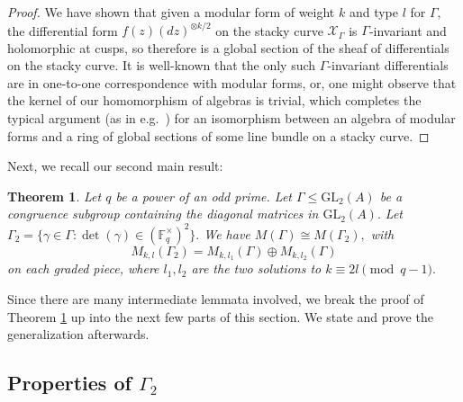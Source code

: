\documentclass[11pt]{amsart}
\newtheorem{theorem}{Theorem}[section]
\newtheorem{remark}[theorem]{Remark}
\theoremstyle{definition}
\numberwithin{equation}{section}
\newcommand{\GL}{\mathrm{GL}} 	%
\newcommand{\cO}{\mathcal{O}}		%
\newcommand{\sX}{\mathscr{X}}		%
\newcommand{\bbF}{\mathbb{F}}		%
\begin{document}
\begin{proof}
			We have shown that given a modular form of weight $k$ and type $l$ for $\Gamma,$ the differential form $f(z)(dz)^{\otimes k/2}$ on the stacky curve $\sX_{\Gamma}$ is $\Gamma$-invariant and holomorphic at cusps, so therefore is a global section of the sheaf of differentials on the stacky curve. It is well-known that the only such $\Gamma$-invariant differentials are in one-to-one correspondence with modular forms, or, one might observe that the kernel of our homomorphism of algebras is trivial, which completes the typical argument (as in e.g.\ \cite[Chapter $6.2$]{VZB}) for an isomorphism between an algebra of modular forms and a ring of global sections of some line bundle on a stacky curve.
		\end{proof}
		
		Next, we recall our second main result:
		\begin{theorem}
		\label{thm: decomp of mod forms}
			Let $q$ be a power of an odd prime. Let $\Gamma\leq \GL_2(A)$ be a congruence subgroup containing the diagonal matrices in $\GL_2(A).$ Let $\Gamma_2=\{\gamma\in \Gamma: \det(\gamma)\in (\bbF_q^{\times})^2\}.$ We have
			$M(\Gamma)\cong M(\Gamma_2),$
			with \[M_{k,l}(\Gamma_2)=M_{k,l_1}(\Gamma)\oplus M_{k,l_2}(\Gamma)\] on each graded piece, where $l_1,l_2$ are the two solutions to $k\equiv 2l\pmod{q-1}.$ 
		\end{theorem}
		
		Since there are many intermediate lemmata involved, we break the proof of Theorem \ref{thm: decomp of mod forms} up into the next few parts of this section. We state and prove the generalization afterwards.
		
		\subsection{Properties of $\Gamma_2$}
		
\end{document}
